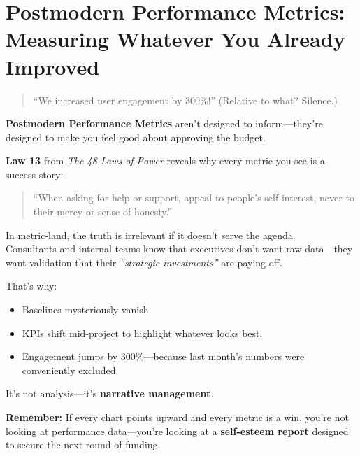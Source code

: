 \section{Postmodern Performance Metrics: Measuring Whatever You Already Improved}

\begin{quote}
“We increased user engagement by 300\%!” (Relative to what? Silence.)
\end{quote}

  \textbf{Postmodern Performance Metrics} aren’t designed to inform—they’re designed to make you feel good about approving the budget.
  
  \medskip
  
  \textbf{Law 13} from \textit{The 48 Laws of Power} reveals why every metric you see is a success story:
  \begin{quote}
  ``When asking for help or support, appeal to people’s self-interest, never to their mercy or sense of honesty.''
  \end{quote}
  
  \medskip
  
  In metric-land, the truth is irrelevant if it doesn’t serve the agenda. \\
  Consultants and internal teams know that executives don’t want raw data—they want validation that their \textit{``strategic investments''} are paying off.
  
  \medskip
  
  That’s why:
  \begin{itemize}
    \item Baselines mysteriously vanish.
    \item KPIs shift mid-project to highlight whatever looks best.
    \item Engagement jumps by 300\%—because last month’s numbers were conveniently excluded.
  \end{itemize}
  
  \medskip
  
  It’s not analysis—it’s \textbf{narrative management}.
  
  \medskip
  
  \textbf{Remember:} If every chart points upward and every metric is a win, you're not looking at performance data—you're looking at a \textbf{self-esteem report} designed to secure the next round of funding.
  


